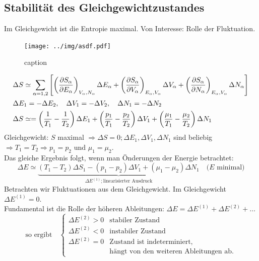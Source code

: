 \subsection{Stabilität des Gleichgewichtzustandes}
Im Gleichgewicht ist die Entropie maximal. Von Interesse: Rolle der Fluktuation.
\begin{figure}[H]
    \begin{center}
        \texttt{[image: ../img/asdf.pdf]}
        \caption{caption}
        \label{img:label}
    \end{center}
\end{figure}
\begin{equation}
    \begin{split}
        & \Delta S \simeq \sum_{\alpha = 1, 2} \left[ \left( \frac{\partial S_\alpha}{\partial E_\alpha} \right)_{V_\alpha, N_\alpha} \Delta E_\alpha
        + \left( \frac{\partial S_\alpha}{\partial V_\alpha} \right)_{E_\alpha, V_\alpha} \Delta V_\alpha + \left( \frac{\partial S_\alpha}{\partial N_\alpha} \right)_{E_\alpha, V_\alpha} \Delta N_\alpha \right] \\
        & \Delta E_1 = - \Delta E_2, \quad \Delta V_1 = - \Delta V_2, \quad \Delta N_1 = - \Delta N_2 \\
        & \Delta S \simeq = \left( \frac{1}{T_1} - \frac{1}{T_2} \right) \Delta E_1 + \left( \frac{p_1}{T_1}
        - \frac{p_2}{T_2} \right) \Delta V_1 + \left( \frac{\mu_1}{T_1} - \frac{\mu_2}{T_2} \right) \Delta N_1
    \end{split}
\end{equation}
Gleichgewicht: $S$ maximal $\Rightarrow \Delta S = 0; \Delta E_1, \Delta V_1, \Delta N_1$ sind beliebig
$\Rightarrow T_1 = T_2 \Rightarrow p_1 = p_2$ und $\mu_1 = \mu_2$. \\
Das gleiche Ergebnis folgt, wenn man Önderungen der Energie betrachtet:
\begin{equation}
    \Delta E \simeq \underbrace{\left( T_1 - T_2 \right)  \Delta S_1 - \left( p_1 - p_2 \right) \Delta V_1 + \left( \mu_1 - \mu_2 \right) \Delta N_1}_{\Delta E^{(1)}; \text{linearisierter Ausdruck}} \quad \text{($E$ minimal)}
\end{equation}
Betrachten wir Fluktuationen aus dem Gleichgewicht. Im Gleichgewicht $\Delta E^{(1)} = 0$. \\
Fundamental ist die Rolle der höheren Ableitungen: $\Delta E = \Delta E^{(1)} + \Delta E^{(2)} + \ldots$
\begin{equation}
    \text{so ergibt} \quad
    \begin{cases}
        \Delta E^{(2)} > 0 & \text{stabiler Zustand} \\
        \Delta E^{(2)} < 0 & \text{instabiler Zustand} \\
        \Delta E^{(2)} = 0 & \text{Zustand ist indeterminiert,} \\
        & \text{hängt von den weiteren Ableitungen ab.}
    \end{cases}
\end{equation}